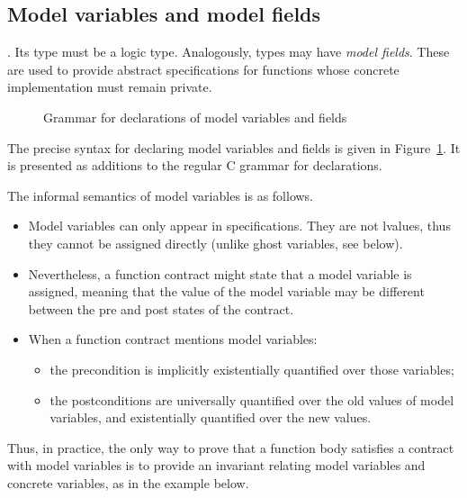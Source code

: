 
\subsection{Model variables and model fields}
\label{sec:model}
 . Its type must be a logic type. Analogously,
types may have \emph{model fields}.  These are
used to provide abstract specifications for functions whose concrete
implementation must remain private.

\begin{figure}[b]
  \begin{cadre}
      
    \end{cadre}
  \caption{Grammar for declarations of model variables and fields}
\label{fig:gram:model}
\end{figure}


The precise syntax for declaring model variables and fields is given
in Figure~\ref{fig:gram:model}. It is presented as additions to the
regular C grammar for declarations.

The informal semantics of model variables is as follows.
\begin{itemize}
\item Model variables can only appear in specifications. They are not
  lvalues, thus they cannot be assigned directly (unlike ghost variables,
  see below).
\item Nevertheless, a function contract might state that a model variable
  is assigned, meaning that the value of the model variable may be different between the pre and post states of the contract.
\item When a function contract mentions model variables:
  \begin{itemize}
  \item the precondition is implicitly existentially quantified over
    those variables;
  \item the postconditions are universally quantified over the old
    values of model variables, and existentially quantified over the new values.
  \end{itemize}
\end{itemize}
Thus, in practice, the only way to prove that a function body
satisfies a contract with model variables is to provide an invariant
relating model variables and concrete variables, as in the example
below.

